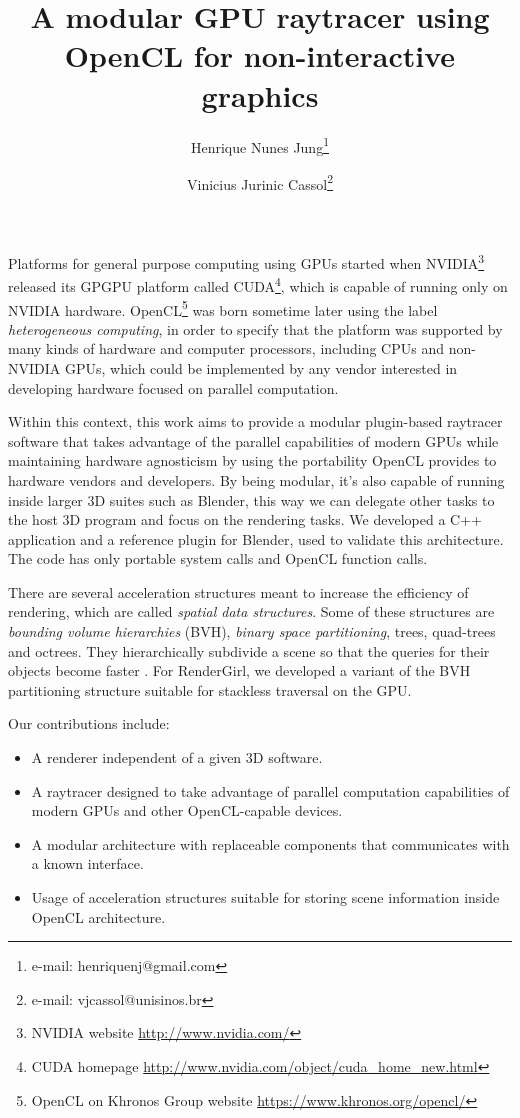 \documentclass{vgtc}
\title{A modular GPU raytracer using OpenCL for non-interactive graphics}
\author{Henrique Nunes Jung\thanks{e-mail: henriquenj@gmail.com}
\and Vinicius Jurinic Cassol\thanks{e-mail: vjcassol@unisinos.br}}
\affiliation{\scriptsize Universidade do Vale do Rio dos Sinos, Escola Politécnica, Brazil}
\begin{document}

\maketitle

Platforms for general purpose computing using GPUs started when
NVIDIA\footnote{NVIDIA website \url{http://www.nvidia.com/}} released
its GPGPU platform called CUDA\footnote{CUDA homepage
 \url{http://www.nvidia.com/object/cuda_home_new.html}}, which is
capable of running only on NVIDIA hardware. OpenCL\footnote{OpenCL on
 Khronos Group website \url{https://www.khronos.org/opencl/}} was
born sometime later using the label \emph{heterogeneous computing}, in
order to specify that the platform was supported by many kinds of
hardware and computer processors, including CPUs and non-NVIDIA GPUs,
which could be implemented by any vendor interested in developing
hardware focused on parallel computation.

Within this context, this work aims to provide a modular plugin-based
raytracer software that takes advantage of the parallel capabilities
of modern GPUs while maintaining hardware agnosticism by using the
portability OpenCL provides to hardware vendors and developers. By
being modular, it's also capable of running inside larger 3D suites
such as Blender, this way we can delegate other tasks to the host 3D
program and focus on the rendering tasks. We developed a C++
application and a reference plugin for Blender, used to validate this
architecture. The code has only portable system calls and OpenCL
function calls.

There are several acceleration structures meant to increase the
efficiency of rendering, which are called \emph{spatial data
  structures}. Some of these structures are \emph{bounding volume
  hierarchies} (BVH), \emph{binary space partitioning}, trees,
quad-trees and octrees. They hierarchically subdivide a scene so that
the queries for their objects become faster
\cite[Chapter~14.1]{akenine-moller:2008}. For RenderGirl, we developed
a variant of the BVH partitioning structure suitable for stackless
traversal on the GPU.


Our contributions include:

\begin{itemize}
  \item A renderer independent of a given 3D software.
  \item A raytracer designed to take advantage of parallel
    computation capabilities of modern GPUs and other OpenCL-capable
    devices.
  \item A modular architecture with replaceable components that
    communicates with a known interface.
  \item Usage of acceleration structures suitable for storing scene
    information inside OpenCL architecture.

\end{itemize}
\end{document}
